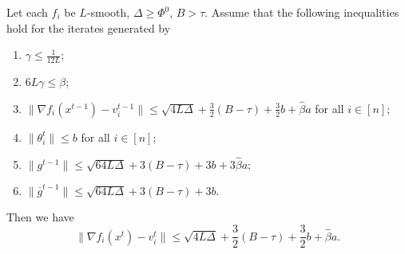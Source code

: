 \documentclass[a4paper,11pt]{article}
\begin{document}
\begin{lemma}\label{lem:bound_nablafxt_vt_dp}
    Let each $f_i$ be $L$-smooth, $\Delta \ge \Phi^0$, $B > \tau$. Assume that the following inequalities hold for the iterates generated by 
    \begin{enumerate}
        \item $\gamma \le \frac{1}{12L}$;
        \item $6L\gamma \le \beta$;
        \item $\|\nabla f_i(x^{t-1}) - v_i^{t-1}\| \le \sqrt{4L\Delta} + \frac{3}{2}(B-\tau) + \frac{3}{2} b + \hat{\beta}a$ for all $i\in[n];$
        \item $\|\theta^t_i\|\le b$ for all $i\in[n];$
        \item $\|g^{t-1}\| \le \sqrt{64L\Delta} + 3(B-\tau) + 3 b + 3\hat{\beta}a;$
        \item $\|\overline{g}^{t-1}\| \le \sqrt{64L\Delta} + 3(B-\tau) + 3 b.$
    \end{enumerate}
    Then we have 
    \begin{equation}
        \|\nabla f_i(x^t)-v_i^t\| \le \sqrt{4L\Delta}+\frac{3}{2}(B-\tau) + \frac{3}{2} b
        + \hat{\beta}a.
    \end{equation}
\end{lemma}
\end{document}
